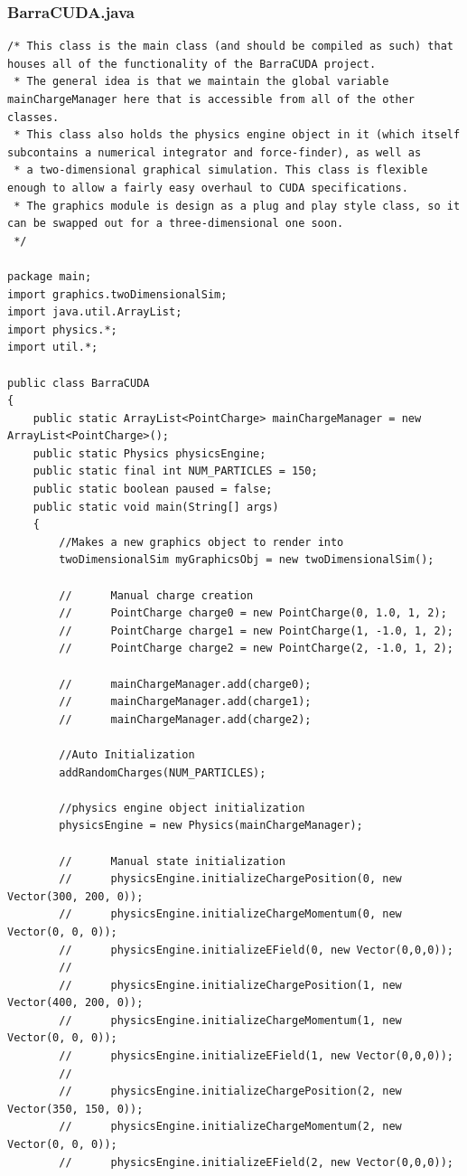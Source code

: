 \documentclass[10pt]{article}
\begin{document}
\subsubsection{BarraCUDA.java}
\begin{verbatim}
/* This class is the main class (and should be compiled as such) that houses all of the functionality of the BarraCUDA project.
 * The general idea is that we maintain the global variable mainChargeManager here that is accessible from all of the other classes.
 * This class also holds the physics engine object in it (which itself subcontains a numerical integrator and force-finder), as well as 
 * a two-dimensional graphical simulation. This class is flexible enough to allow a fairly easy overhaul to CUDA specifications.
 * The graphics module is design as a plug and play style class, so it can be swapped out for a three-dimensional one soon.
 */

package main;
import graphics.twoDimensionalSim;
import java.util.ArrayList;
import physics.*;
import util.*;

public class BarraCUDA 
{
	public static ArrayList<PointCharge> mainChargeManager = new ArrayList<PointCharge>();
	public static Physics physicsEngine;
	public static final int NUM_PARTICLES = 150;
	public static boolean paused = false;
	public static void main(String[] args)
	{
		//Makes a new graphics object to render into
		twoDimensionalSim myGraphicsObj = new twoDimensionalSim();

		//		Manual charge creation
		//		PointCharge charge0 = new PointCharge(0, 1.0, 1, 2);
		//		PointCharge charge1 = new PointCharge(1, -1.0, 1, 2);
		//		PointCharge charge2 = new PointCharge(2, -1.0, 1, 2);

		//		mainChargeManager.add(charge0);
		//		mainChargeManager.add(charge1);
		//		mainChargeManager.add(charge2);

		//Auto Initialization
		addRandomCharges(NUM_PARTICLES);

		//physics engine object initialization
		physicsEngine = new Physics(mainChargeManager);

		//		Manual state initialization
		//		physicsEngine.initializeChargePosition(0, new Vector(300, 200, 0));
		//		physicsEngine.initializeChargeMomentum(0, new Vector(0, 0, 0));
		//		physicsEngine.initializeEField(0, new Vector(0,0,0));
		//
		//		physicsEngine.initializeChargePosition(1, new Vector(400, 200, 0));
		//		physicsEngine.initializeChargeMomentum(1, new Vector(0, 0, 0));
		//		physicsEngine.initializeEField(1, new Vector(0,0,0));
		//
		//		physicsEngine.initializeChargePosition(2, new Vector(350, 150, 0));
		//		physicsEngine.initializeChargeMomentum(2, new Vector(0, 0, 0));
		//		physicsEngine.initializeEField(2, new Vector(0,0,0));


\end{verbatim}
\end{document}
